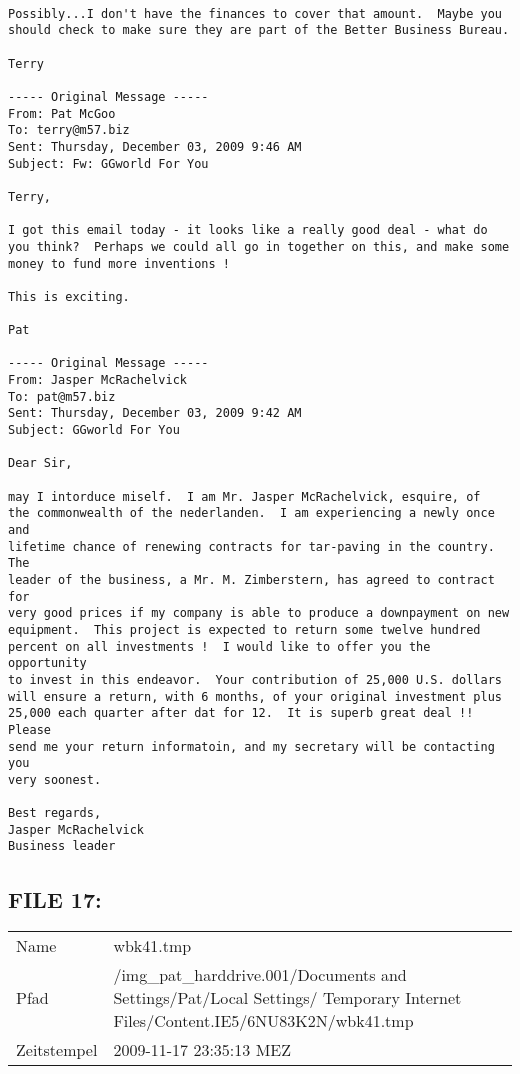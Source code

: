 \begin{lstlisting}

Possibly...I don't have the finances to cover that amount.  Maybe you 
should check to make sure they are part of the Better Business Bureau. 

Terry

----- Original Message -----
From: Pat McGoo
To: terry@m57.biz
Sent: Thursday, December 03, 2009 9:46 AM
Subject: Fw: GGworld For You

Terry,

I got this email today - it looks like a really good deal - what do
you think?  Perhaps we could all go in together on this, and make some
money to fund more inventions !

This is exciting.

Pat

----- Original Message -----
From: Jasper McRachelvick
To: pat@m57.biz
Sent: Thursday, December 03, 2009 9:42 AM
Subject: GGworld For You

Dear Sir,

may I intorduce miself.  I am Mr. Jasper McRachelvick, esquire, of
the commonwealth of the nederlanden.  I am experiencing a newly once and
lifetime chance of renewing contracts for tar-paving in the country.  The
leader of the business, a Mr. M. Zimberstern, has agreed to contract for
very good prices if my company is able to produce a downpayment on new
equipment.  This project is expected to return some twelve hundred
percent on all investments !  I would like to offer you the opportunity
to invest in this endeavor.  Your contribution of 25,000 U.S. dollars
will ensure a return, with 6 months, of your original investment plus
25,000 each quarter after dat for 12.  It is superb great deal !!  Please
send me your return informatoin, and my secretary will be contacting you
very soonest.

Best regards,
Jasper McRachelvick
Business leader
\end{lstlisting}

\subsection{FILE 17:}	

\begin{table}[htb]
	\begin{tabular}{p{2cm} p{13.5cm}}
		Name & wbk41.tmp\\
		Pfad & /img_pat_harddrive.001/Documents and Settings/Pat/Local Settings/ Temporary Internet Files/Content.IE5/6NU83K2N/wbk41.tmp\\
		Zeitstempel & 2009-11-17 23:35:13 MEZ
	\end{tabular}
\end{table}	


